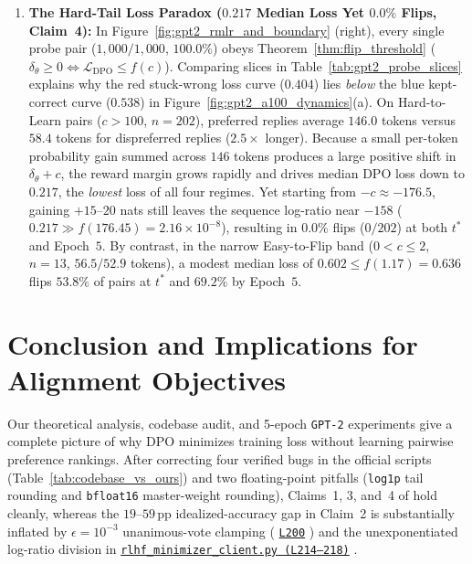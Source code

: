\documentclass[11pt]{article}
\theoremstyle{plain}
\theoremstyle{definition}
\newcommand{\LDPO}{\mathcal{L}_{\mathrm{DPO}}}
\newcommand{\ghline}[2]{%
  \href{https://github.com/angie-chen55/pref-learning-ranking-acc/blob/main/#1}{\texttt{#2}}%
}
\begin{document}
\begin{enumerate}[leftmargin=1.8em,itemsep=2.5pt,topsep=2pt]
  \item \textbf{The Hard-Tail Loss Paradox ($0.217$ Median Loss Yet $0.0\%$ Flips, Claim~4):} In Figure~\ref{fig:gpt2_rmlr_and_boundary} (right), every single probe pair ($1{,}000 / 1{,}000$, $100.0\%$) obeys Theorem~\ref{thm:flip_threshold} ($\delta_\theta \ge 0 \iff \LDPO \le f(c)$). Comparing slices in Table~\ref{tab:gpt2_probe_slices} explains why the red stuck-wrong loss curve ($0.404$) lies \emph{below} the blue kept-correct curve ($0.538$) in Figure~\ref{fig:gpt2_a100_dynamics}(a). On Hard-to-Learn pairs ($c > 100$, $n = 202$), preferred replies average $146.0$ tokens versus $58.4$ tokens for dispreferred replies ($2.5\times$ longer). Because a small per-token probability gain summed across $146$ tokens produces a large positive shift in $\delta_\theta + c$, the reward margin grows rapidly and drives median DPO loss down to $0.217$, the \emph{lowest} loss of all four regimes. Yet starting from $-c \approx -176.5$, gaining $+15\text{--}20$ nats still leaves the sequence log-ratio near $-158$ ($0.217 \gg f(176.45) = 2.16 \times 10^{-8}$), resulting in $0.0\%$ flips ($0 / 202$) at both $t^*$ and Epoch~$5$. By contrast, in the narrow Easy-to-Flip band ($0 < c \le 2$, $n = 13$, $56.5 / 52.9$ tokens), a modest median loss of $0.602 \le f(1.17) = 0.636$ flips $53.8\%$ of pairs at $t^*$ and $69.2\%$ by Epoch~$5$.
\end{enumerate}

\section{Conclusion and Implications for Alignment Objectives}
\label{sec:discussion}

Our theoretical analysis, codebase audit, and 5-epoch \texttt{GPT-2} experiments give a complete picture of why DPO minimizes training loss without learning pairwise preference rankings. After correcting four verified bugs in the official scripts (Table~\ref{tab:codebase_vs_ours}) and two floating-point pitfalls (\texttt{log1p} tail rounding and \texttt{bfloat16} master-weight rounding), Claims~1, 3, and~4 of \citet{chen2024preference} hold cleanly, whereas the $19\text{--}59$\,pp idealized-accuracy gap in Claim~2 is substantially inflated by $\epsilon = 10^{-3}$ unanimous-vote clamping (\ghline{rlhf_minimizer_client.py\#L200}{L200}) and the unexponentiated log-ratio division in \ghline{rlhf_minimizer_client.py\#L214-L218}{rlhf\_minimizer\_client.py (L214--218)}.
\end{document}
